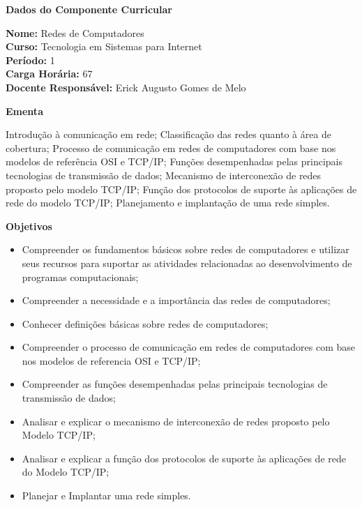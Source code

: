 

\begin{snugshade}\begin{center}\textbf{
	Dados do Componente Curricular
}\end{center}\end{snugshade}

\noindent 	\textbf{Nome:} Redes de Computadores
\\ 			\textbf{Curso:} Tecnologia em Sistemas para Internet
\\ 			\textbf{Período:} \unit{1}{\degree}
\\ 			\textbf{Carga Horária:} \unit{67}{\hour}
\\ 			\textbf{Docente Responsável:} Erick Augusto Gomes de Melo


\begin{snugshade}\begin{center}\textbf{
    Ementa
\vphantom{q}}\end{center}\end{snugshade}

\noindent

Introdução à comunicação em rede; Classificação das redes quanto à área de cobertura; Processo de comunicação em redes de computadores com base nos modelos de referência OSI e TCP/IP; Funções desempenhadas pelas principais tecnologias de transmissão de dados; Mecanismo de interconexão de redes proposto pelo modelo TCP/IP; Função dos protocolos de suporte às aplicações de rede do modelo TCP/IP; Planejamento e implantação de uma rede simples.


\begin{snugshade}\begin{center}\textbf{
    Objetivos
}\end{center}\end{snugshade}


\begin{itemize}

\item Compreender os fundamentos básicos sobre redes de computadores e utilizar seus recursos para suportar as atividades relacionadas ao desenvolvimento de programas computacionais;
\item Compreender a necessidade e a importância das redes de computadores;
\item Conhecer definições básicas sobre redes de computadores;
\item Compreender o processo de comunicação em redes de computadores com base nos modelos de referencia OSI e TCP/IP;
\item Compreender as funções desempenhadas pelas principais tecnologias de transmissão de dados;
\item Analisar e explicar o mecanismo de interconexão de redes proposto pelo Modelo TCP/IP;
\item Analisar e explicar a função dos protocolos de suporte às aplicações de rede do Modelo TCP/IP;
\item Planejar e Implantar uma rede simples.

\end{itemize} 

